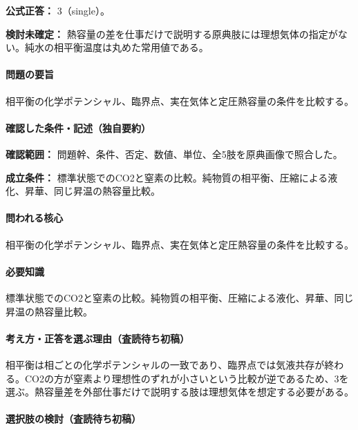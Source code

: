 \textbf{公式正答：} 3（single）。

\par\textbf{検討未確定：} 熱容量の差を仕事だけで説明する原典肢には理想気体の指定がない。純水の相平衡温度は丸めた常用値である。

\paragraph{問題の要旨} 相平衡の化学ポテンシャル、臨界点、実在気体と定圧熱容量の条件を比較する。

\paragraph{確認した条件・記述（独自要約）}\mbox{}\par

\noindent\textbf{確認範囲：} 問題幹、条件、否定、数値、単位、全5肢を原典画像で照合した。\par

\noindent\textbf{成立条件：} 標準状態でのCO2と窒素の比較。純物質の相平衡、圧縮による液化、昇華、同じ昇温の熱容量比較。\par

\paragraph{問われる核心} 相平衡の化学ポテンシャル、臨界点、実在気体と定圧熱容量の条件を比較する。

\paragraph{必要知識} 標準状態でのCO2と窒素の比較。純物質の相平衡、圧縮による液化、昇華、同じ昇温の熱容量比較。

\paragraph{考え方・正答を選ぶ理由（査読待ち初稿）} 相平衡は相ごとの化学ポテンシャルの一致であり、臨界点では気液共存が終わる。CO2の方が窒素より理想性のずれが小さいという比較が逆であるため、3を選ぶ。熱容量差を外部仕事だけで説明する肢は理想気体を想定する必要がある。

\paragraph{選択肢の検討（査読待ち初稿）}\mbox{}\par

